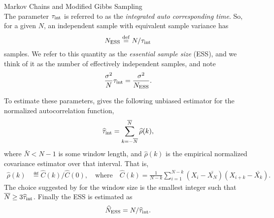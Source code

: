 \begin{chapter}{Markov Chains and Modified Gibbs Sampling}
\begin{equation}
\end{equation}
The parameter $\tau_{\rm int}$ is referred to as the \emph{integrated auto corresponding time}.
So, for a given $N$, an independent sample with equivalent sample variance has
\begin{equation}
  N_{\rm ESS} \eqdef N/\tau_{\rm int}
\end{equation}
samples.
We refer to this quantity as the \emph{essential sample size} (ESS), and we think of it as the number of effectively independent samples, and note
\begin{equation}
  \frac{\sigma^2}{N} \tau_{\rm int} = \frac{\sigma^2}{N_{\rm ESS}}.
\end{equation}

To estimate these parameters, \citep{sokal1997monte} gives the following unbiased estimator for the normalized autocorrelation function,
\begin{equation}
  \hat\tau_{\rm int}=\sum_{k=-\bar N}^{\bar N} \hat{\rho}(k),
\end{equation}
where $\bar N< N-1$ is some window length, and $\hat \rho(k)$ is the empirical normalized covariance estimator over that interval.
That is,
\begin{align}
\hat\rho(k)&\eqdef \hat C(k)/\hat C(0), \quad\text{where}\quad
\hat C(k)=\frac{1}{N-k}\sum_{i=1}^{N-k} (X_i-\bar{X_N})(X_{i+k}-\bar{X_k}).
\end{align}
The choice suggested by \cite{sokal1997monte} for the window size is the smallest integer such that $\bar N\geq 3 \hat\tau_{\rm int}$. 
Finally the ESS is estimated as
\begin{equation}
\label{ESS}
\hat{N}_{\rm ESS}=N/\hat\tau_{\rm int}.
\end{equation}

\end{chapter}

